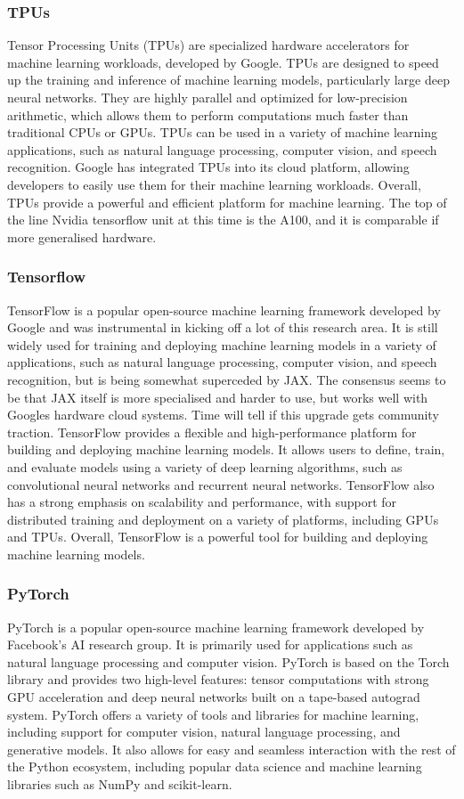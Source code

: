 \subsubsection{TPUs}
Tensor Processing Units (TPUs) are specialized hardware accelerators for machine learning workloads, developed by Google. TPUs are designed to speed up the training and inference of machine learning models, particularly large deep neural networks. They are highly parallel and optimized for low-precision arithmetic, which allows them to perform computations much faster than traditional CPUs or GPUs. TPUs can be used in a variety of machine learning applications, such as natural language processing, computer vision, and speech recognition. Google has integrated TPUs into its cloud platform, allowing developers to easily use them for their machine learning workloads. Overall, TPUs provide a powerful and efficient platform for machine learning.
The top of the line Nvidia tensorflow unit at this time is the A100, and it is comparable if more generalised hardware.
\subsubsection{Tensorflow}
TensorFlow is a popular open-source machine learning framework developed by Google and was instrumental in kicking off a lot of this research area. It is still widely used for training and deploying machine learning models in a variety of applications, such as natural language processing, computer vision, and speech recognition, but is being somewhat superceded by JAX. The consensus seems to be that JAX itself is more specialised and harder to use, but works well with Googles hardware cloud systems. Time will tell if this upgrade gets community traction. TensorFlow provides a flexible and high-performance platform for building and deploying machine learning models. It allows users to define, train, and evaluate models using a variety of deep learning algorithms, such as convolutional neural networks and recurrent neural networks. TensorFlow also has a strong emphasis on scalability and performance, with support for distributed training and deployment on a variety of platforms, including GPUs and TPUs. Overall, TensorFlow is a powerful tool for building and deploying machine learning models.
\subsubsection{PyTorch}
PyTorch is a popular open-source machine learning framework developed by Facebook's AI research group. It is primarily used for applications such as natural language processing and computer vision. PyTorch is based on the Torch library and provides two high-level features: tensor computations with strong GPU acceleration and deep neural networks built on a tape-based autograd system. PyTorch offers a variety of tools and libraries for machine learning, including support for computer vision, natural language processing, and generative models. It also allows for easy and seamless interaction with the rest of the Python ecosystem, including popular data science and machine learning libraries such as NumPy and scikit-learn. 
